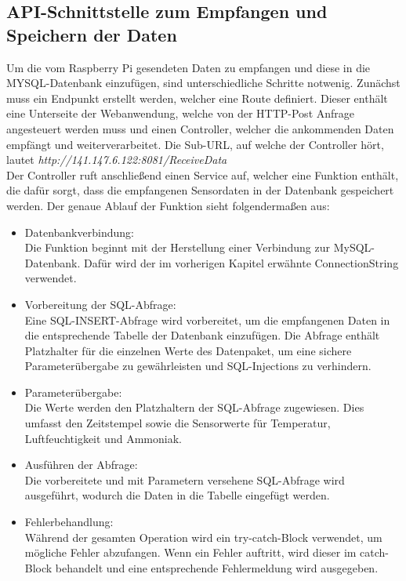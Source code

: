 \documentclass[conference]{IEEEtran}
\begin{document}
\subsection{API-Schnittstelle zum Empfangen und Speichern der Daten}
Um die vom Raspberry Pi gesendeten Daten zu empfangen und diese in die MYSQL-Datenbank einzufügen, sind unterschiedliche Schritte notwenig. Zunächst muss ein Endpunkt erstellt werden, welcher eine Route definiert. Dieser enthält eine Unterseite der Webanwendung, welche von der HTTP-Post Anfrage angesteuert werden muss und einen Controller, welcher die ankommenden Daten empfängt und weiterverarbeitet. Die Sub-URL, auf welche der Controller hört, lautet \textit{http://141.147.6.122:8081/ReceiveData} \\
Der Controller ruft anschließend einen Service auf, welcher eine Funktion enthält, die dafür sorgt, dass die empfangenen Sensordaten in der Datenbank gespeichert werden. Der genaue Ablauf der Funktion sieht folgendermaßen aus:
\begin{itemize}
	\item Datenbankverbindung: \\
	Die Funktion beginnt mit der Herstellung einer Verbindung zur MySQL-Datenbank. Dafür wird der im vorherigen Kapitel erwähnte ConnectionString verwendet.
	\item Vorbereitung der SQL-Abfrage: \\
	Eine SQL-INSERT-Abfrage wird vorbereitet, um die empfangenen Daten in die entsprechende Tabelle der Datenbank einzufügen. Die Abfrage enthält Platzhalter für die einzelnen Werte des Datenpaket, um eine sichere Parameterübergabe zu gewährleisten und SQL-Injections zu verhindern.
	\item Parameterübergabe: \\
	Die Werte werden den Platzhaltern der SQL-Abfrage zugewiesen. Dies umfasst den Zeitstempel sowie die Sensorwerte für Temperatur, Luftfeuchtigkeit und Ammoniak.
	\item Ausführen der Abfrage: \\
	Die vorbereitete und mit Parametern versehene SQL-Abfrage wird ausgeführt, wodurch die Daten in die Tabelle eingefügt werden.
	\item Fehlerbehandlung: \\
	Während der gesamten Operation wird ein try-catch-Block verwendet, um mögliche Fehler abzufangen. Wenn ein Fehler auftritt, wird dieser im catch-Block behandelt und eine entsprechende Fehlermeldung wird ausgegeben.
\end{itemize}
\end{document}
